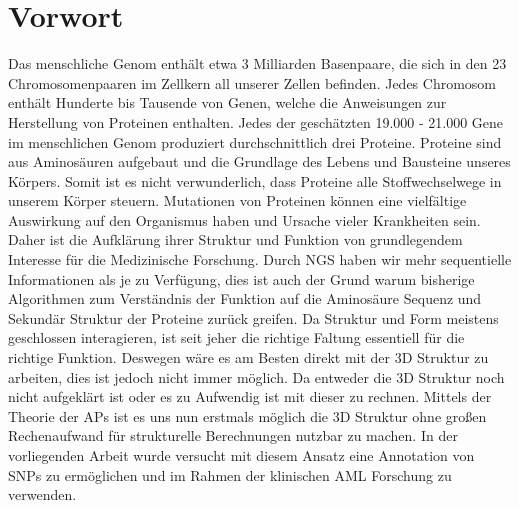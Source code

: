 \chapter{Vorwort}

Das menschliche Genom enthält etwa 3 Milliarden Basenpaare, die sich in den 23 Chromosomenpaaren im Zellkern all unserer Zellen befinden. Jedes Chromosom enthält Hunderte bis Tausende von Genen, welche die Anweisungen zur Herstellung von Proteinen enthalten. Jedes der geschätzten 19.000 - 21.000 Gene\cite{Ezkurdia.2014} im menschlichen Genom produziert durchschnittlich drei Proteine. Proteine sind aus Aminosäuren aufgebaut und die Grundlage des Lebens und Bausteine unseres Körpers. Somit ist es nicht verwunderlich, dass Proteine alle Stoffwechselwege in unserem Körper steuern. Mutationen von Proteinen können eine vielfältige Auswirkung auf den Organismus haben und Ursache vieler Krankheiten sein. Daher ist die Aufklärung ihrer Struktur und Funktion von grundlegendem Interesse für die Medizinische Forschung. 
Durch \ac{NGS} haben wir mehr sequentielle Informationen als je zu Verfügung, dies ist auch der Grund warum bisherige Algorithmen zum Verständnis der Funktion auf die Aminosäure Sequenz und Sekundär Struktur der Proteine zurück greifen. Da Struktur und Form meistens geschlossen interagieren, ist seit jeher die richtige Faltung essentiell für die richtige Funktion. Deswegen wäre es am Besten direkt mit der 3D Struktur zu arbeiten, dies ist jedoch nicht immer möglich. Da entweder die 3D Struktur noch nicht aufgeklärt ist oder es zu Aufwendig ist mit dieser zu rechnen.
Mittels der Theorie der \ac{APs} ist es uns nun erstmals möglich die 3D Struktur ohne großen Rechenaufwand für strukturelle Berechnungen nutzbar zu machen. In der vorliegenden Arbeit wurde versucht mit diesem Ansatz eine Annotation von \ac{SNPs} zu ermöglichen und im Rahmen der klinischen \ac{AML} Forschung zu verwenden.

